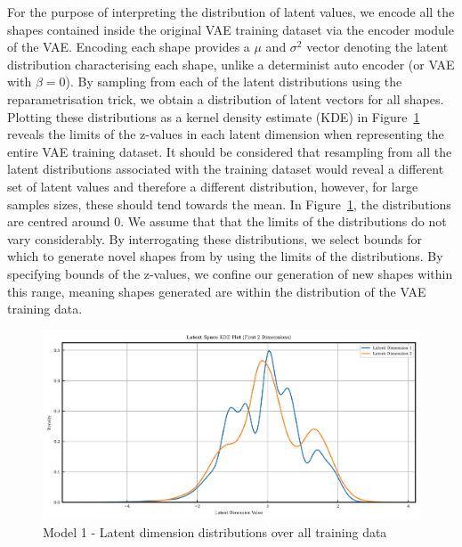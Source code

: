 \documentclass{article}
\begin{document}
For the purpose of interpreting the distribution of latent values, we encode all the shapes contained inside the original VAE training dataset via the encoder module of the VAE. Encoding each shape provides a $\mu$ and $\sigma^2$ vector denoting the latent distribution characterising each shape, unlike a determinist auto encoder (or VAE with $\beta=0$). By sampling from each of the latent distributions using the reparametrisation trick, we obtain a distribution of latent vectors for all shapes.  Plotting these distributions as a kernel density estimate (KDE) in Figure~\ref{fig:model1_latent_dist} reveals the limits of the z-values in each latent dimension when representing the entire VAE training dataset. It should be considered that resampling from all the latent distributions associated with the training dataset would reveal a different set of latent values and therefore a different distribution, however, for large samples sizes, these should tend towards the mean. In Figure~\ref{fig:model1_latent_dist}, the distributions are centred around 0. We assume that that the limits of the distributions do not vary considerably. By interrogating these distributions, we select bounds for which to generate novel shapes from by using the limits of the distributions. By specifying bounds of the z-values, we confine our generation of new shapes within this range, meaning shapes generated are within the distribution of the VAE training data. 

\begin{figure}[H]
    \centering
    \includegraphics[width=0.75\linewidth]{figures/VAEmodels/model1/latent_distribution.png}
    \caption{Model 1 - Latent dimension distributions over all training data}
    \label{fig:model1_latent_dist}
\end{figure}
\end{document}
